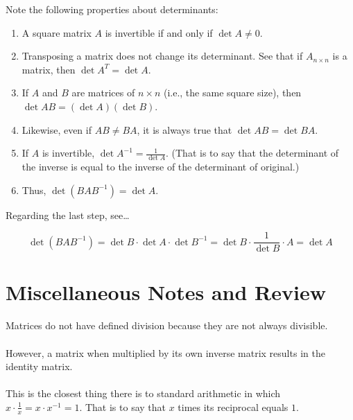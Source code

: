 \documentclass[12pt]{article}
\begin{document}
Note the following properties about determinants:

\begin{enumerate}
    \item A square matrix $A$ is invertible if and only if $\det A \neq 0$.
    \item Transposing a matrix does not change its determinant. See that if $A_{n\times n}$ is a matrix, then $\det A^T = \det A$.
    \item If $A$ and $B$ are matrices of $n\times n$ (i.e., the same square size), then $\det AB = (\det A)(\det B)$.
    \item Likewise, even if $AB \neq BA$, it is always true that $\det AB = \det BA$.
    \item If $A$ is invertible, $\det A^{-1} = \frac{1}{\det A}$. (That is to say that the determinant of the inverse
    is equal to the inverse of the determinant of original.)
    \item Thus, $\det (BAB^{-1}) = \det A$.
\end{enumerate}

Regarding the last step, see\dots

$$\det(BAB^{-1}) = \det B \cdot \det A \cdot \det B^{-1} = \det B \cdot \frac{1}{\det B} \cdot A = \det A$$

\section*{Miscellaneous Notes and Review}

Matrices do not have defined division because they are not always divisible. \\ \\

However, a matrix when multiplied by its own inverse matrix results in the identity matrix. \\ \\

This is the closest thing there is to standard arithmetic in which $x \cdot \frac{1}{x} = x \cdot x^{-1} = 1$.
That is to say that $x$ times its reciprocal equals $1$. \\ \\
\end{document}
